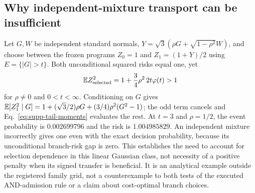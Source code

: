 \subsection{Why independent-mixture transport can be insufficient}
Let $G,W$ be independent standard normals, $Y=\sqrt3(\rho G+\sqrt{1-\rho^2}W)$, and choose between the frozen programs $Z_0=1$ and $Z_1=(1+Y)/2$ using $E=\{|G|>t\}$.
Both unconditional squared risks equal one, yet
\begin{equation}
\mathbb E Z_{\rm selected}^2=1+\frac34\rho^2\,2t\varphi(t)>1
\label{eq:supp-mixture-counterexample}
\end{equation}
for $\rho\ne0$ and $0<t<\infty$.
Conditioning on $G$ gives $\mathbb E[Z_1^2\mid G]=1+(\sqrt3/2)\rho G+(3/4)\rho^2(G^2-1)$; the odd term cancels and Eq.~\eqref{eq:supp-tail-moments} evaluates the rest.
At $t=3$ and $\rho=1/2$, the event probability is $0.002699796$ and the risk is $1.004985829$.
An independent mixture incorrectly gives one even with the exact decision probability, because its unconditional branch-risk gap is zero.
This establishes the need to account for selection dependence in this linear Gaussian class, not necessity of a positive penalty when its signed transfer is beneficial.
It is an analytical example outside the registered family grid, not a counterexample to both tests of the executed AND-admission rule or a claim about cost-optimal branch choices.

